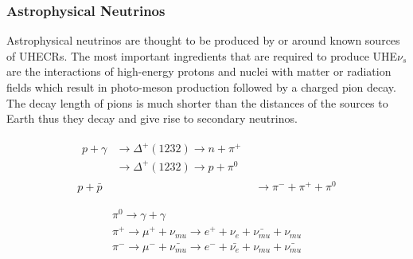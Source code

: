 \subsubsection*{Astrophysical Neutrinos}
\label{subsubsec:AstroNu}

Astrophysical neutrinos are thought to be produced by or around known sources of UHECRs. The most important ingredients that are required to produce UHE$\nu_s$ are the interactions of high-energy protons and nuclei with matter or radiation fields which result in photo-meson production followed by a charged pion decay. The decay length of pions is much shorter than the distances of the sources to Earth thus they decay and give rise to secondary neutrinos. 

\begin{subequations}\label{eq:Nuprod_1}
  \begin{align}
    \begin{split}
      p + \gamma &\longrightarrow \Delta^+(1232 ) \longrightarrow n+\pi^+ \\ 
                      &\longrightarrow \Delta^+(1232 ) \longrightarrow p+\pi^0
    \end{split} \\
      p + \bar{p} &\longrightarrow \pi^- + \pi^+ + \pi^0 
  \end{align}
\end{subequations}

\begin{subequations}\label{eq:Nuprod_2}
  \begin{align}  
    \pi^0 \longrightarrow \gamma + \gamma \\
    \pi^+ \longrightarrow \mu^+ + \nu_{mu} \longrightarrow e^+ + \nu_{e} + \bar{\nu_{mu}} + \nu_{mu} \\
    \pi^- \longrightarrow \mu^- + \bar{\nu_{mu}} \longrightarrow e^- + \bar{\nu_{e}} + \nu_{mu} + \bar{\nu_{mu}}
  \end{align}
\end{subequations}

